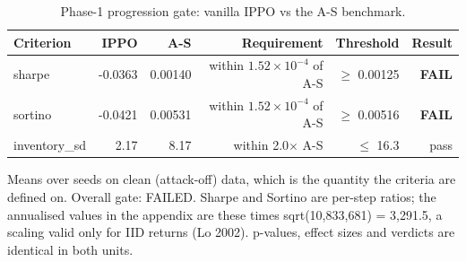 \begin{table}[htbp]
  \centering
  \caption{Phase-1 progression gate: vanilla IPPO vs the A-S benchmark.}
  \label{tab:gate}
  \begin{tabular}{lrrrrr}
    \toprule
    Criterion & IPPO & A-S & Requirement & Threshold & Result \\
    \midrule
    sharpe & -0.0363 & 0.00140 & within $1.52\times10^{-4}$ of A-S & $\geq$ 0.00125 & \textbf{FAIL} \\
    sortino & -0.0421 & 0.00531 & within $1.52\times10^{-4}$ of A-S & $\geq$ 0.00516 & \textbf{FAIL} \\
    inventory\_sd & 2.17 & 8.17 & within 2.0$\times$ A-S & $\leq$ 16.3 & pass \\
    \bottomrule
  \end{tabular}
  \begin{minipage}{\linewidth}\vspace{4pt}\footnotesize Means over seeds on clean (attack-off) data, which is the quantity the criteria are defined on. Overall gate: FAILED. Sharpe and Sortino are per-step ratios; the annualised values in the appendix are these times sqrt(10,833,681) = 3,291.5, a scaling valid only for IID returns (Lo 2002). p-values, effect sizes and verdicts are identical in both units.\end{minipage}
\end{table}
